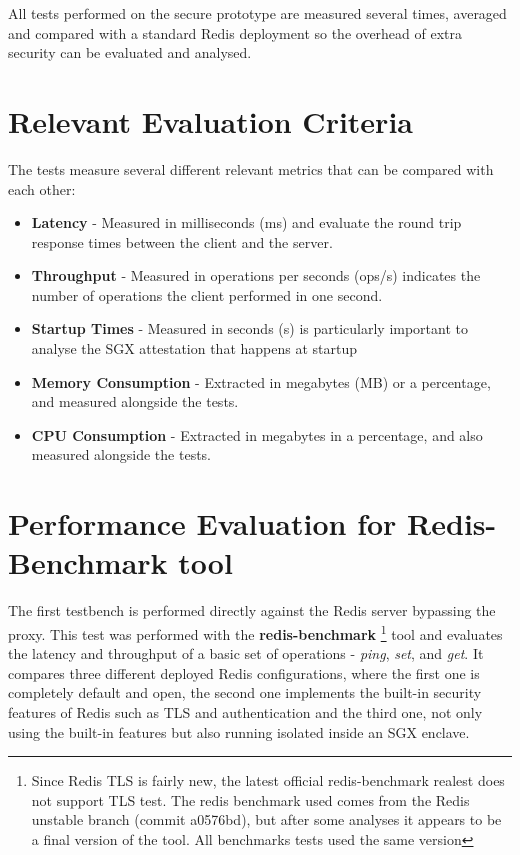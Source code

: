 All tests performed on the secure prototype are measured several times, averaged and compared with a standard Redis deployment so the overhead of extra security can be evaluated and analysed. 

\section{Relevant Evaluation Criteria}
\label{sec:revelant_evaluation_criteria}

The tests measure several different relevant metrics that can be compared with each other: 

\begin{itemize}
  \item \textbf{Latency} - Measured in milliseconds (ms) and evaluate the round trip response times between the client and the server.
  \item \textbf{Throughput} - Measured in operations per seconds (ops/s) indicates the number of operations the client performed in one second.
  \item \textbf{Startup Times} - Measured in seconds (s) is particularly important to analyse the \gls{SGX} attestation that happens at startup
  \item \textbf{Memory Consumption} - Extracted in megabytes (MB) or a percentage, and measured alongside the tests.
  \item \textbf{\gls{CPU} Consumption} - Extracted in megabytes in a percentage, and also measured alongside the tests.
\end{itemize}

\section{Performance Evaluation for Redis-Benchmark tool}
\label{sec:performance_evaluation_redis_benchmark_tool}

The first testbench is performed directly against the Redis server bypassing the proxy. This test was performed with the \textbf{redis-benchmark} \footnote{Since Redis TLS is fairly new, the latest official redis-benchmark realest does not support TLS test. The redis benchmark used comes from the Redis unstable branch (commit a0576bd), but after some analyses it appears to be a final version of the tool. All benchmarks tests used the same version} tool and evaluates the latency and throughput of a basic set of operations - \textit{ping}, \textit{set}, and \textit{get}. It compares three different deployed Redis configurations, where the first one is completely default and open, the second one implements the built-in security features of Redis such as \gls{TLS} and authentication and the third one, not only using the built-in features but also running isolated inside an \gls{SGX} enclave.

